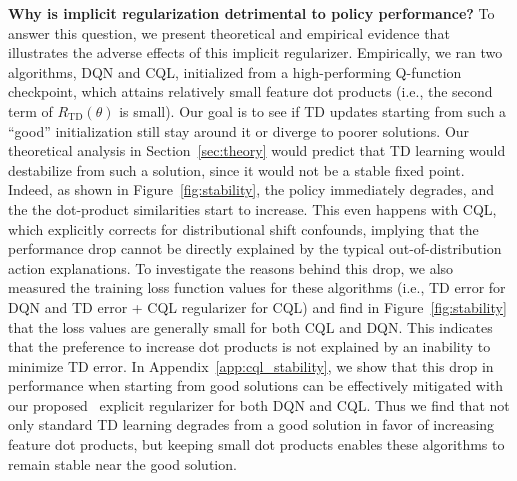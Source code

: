 \textbf{Why is implicit regularization detrimental to policy performance?}
To answer this question, we present theoretical and empirical evidence that illustrates the adverse effects of this implicit regularizer. Empirically, we ran two algorithms, DQN and CQL, initialized from a high-performing Q-function checkpoint,
which attains relatively small feature dot products (i.e., the second term of $R_\mathrm{TD}(\theta)$ is small). Our goal is to see if TD updates starting from such a ``good'' initialization still stay around it or diverge to poorer solutions. Our theoretical analysis in Section~\ref{sec:theory} would predict that TD learning would destabilize from such a solution, since it would not be a stable fixed point. Indeed, as shown in Figure~\ref{fig:stability}, the policy immediately degrades, and the the dot-product similarities start to increase. This even happens with CQL, which explicitly corrects for distributional shift confounds, implying that the performance drop cannot be directly explained by the typical out-of-distribution action explanations. To investigate the reasons behind this drop, we also measured the training loss function values for these algorithms (i.e., TD error for DQN and TD error + CQL regularizer for CQL) and find in Figure~\ref{fig:stability} that the loss values are generally small for both CQL and DQN. This indicates that the preference to increase dot products is not explained by an inability to minimize TD error. 
In Appendix~\ref{app:cql_stability}, we show that this drop in performance when starting from good solutions can be effectively mitigated with our proposed \methodname\ explicit regularizer for both DQN and CQL. Thus we find that not only standard TD learning degrades from a good solution in favor of increasing feature dot products, but keeping small dot products enables these algorithms to remain stable near the good solution.

